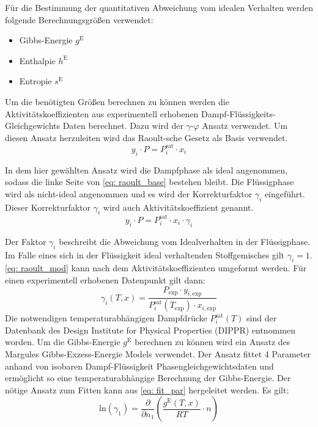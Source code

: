 \documentclass[../thesis.tex]{subfiles}
\begin{document}
Für die Bestimmung der quantitativen Abweichung vom idealen Verhalten werden folgende Berechnungsgrößen verwendet:
\begin{itemize}
	\item Gibbs-Energie $g^{\mathrm{E}}$
	\item Enthalpie $h^{\mathrm{E}}$
	\item Entropie $s^{\mathrm{E}}$
\end{itemize}

Um die benötigten Größen berechnen zu können werden die Aktivitätskoeffizienten aus experimentell erhobenen Dampf-Flüssigkeits-Gleichgewichts Daten berechnet. Dazu wird der $\gamma$-$\varphi$ Ansatz verwendet. Um diesen Ansatz herzuleiten wird das Raoult-sche Gesetz als Basis verwendet.
\begin{equation}
	\label{eq: raoult_base}
	y_i \cdot P = P_{i}^{\mathrm{sat}} \cdot x_i
\end{equation}

In dem hier gewählten Ansatz wird die Dampfphase als ideal angenommen, sodass die linke Seite von \autoref{eq: raoult_base} bestehen bleibt. Die Flüssigphase wird als nicht-ideal angenommen und es wird der Korrekturfaktor $\gamma_i$ eingeführt. Dieser Korrekturfaktor $\gamma_i$ wird auch Aktivitätskoeffizient genannt. 
\begin{equation}
	\label{eq: raoult_mod}
	y_i \cdot P = P_{i}^{\mathrm{sat}} \cdot x_i \cdot \gamma_i
\end{equation}

Der Faktor $\gamma_i$ beschreibt die Abweichung vom Idealverhalten in der Flüssigphase. Im Falle eines sich in der Flüssigkeit ideal verhaltenden Stoffgemisches gilt $\gamma_i = 1$. \autoref{eq: raoult_mod} kann nach dem Aktivitätskoeffizienten umgeformt werden. Für einen experimentell erhobenen Datenpunkt gilt dann:
\begin{equation}
	\gamma_i \left(T,x \right) = \dfrac{P_{\mathrm{exp}} \cdot y_{i,\mathrm{exp}}}{P_{i}^{\mathrm{sat}}(T_{\mathrm{exp}}) \cdot x_{i,\mathrm{exp}}}
\end{equation}
Die notwendigen temperaturabhängigen Dampfdrücke $P_{i}^{\mathrm{sat}}(T)$ sind der Datenbank des Design Institute for Physical Properties (DIPPR) \cite{thomson1996dippr} entnommen worden.
Um die Gibbs-Energie $g^{\mathrm{E}}$ berechnen zu können wird ein Ansatz des Margules Gibbs-Exzess-Energie Models verwendet. Der Ansatz fittet 4 Parameter anhand von isobaren Dampf-Flüssigkeit Phasengleichgewichtsdaten und ermöglicht so eine temperaturabhängige Berechnung der Gibbs-Energie. Der nötige Ansatz zum Fitten kann aus \autoref{eq: fit_par} hergeleitet werden. Es gilt:
\begin{equation}
	\label{eq: fit_par}
	\mathrm{ln}(\gamma_1) =  \dfrac{\partial }{\partial n_1} \left( \dfrac{g^{\mathrm{E}}(T,x)}{RT} \cdot n \right)
\end{equation}
\end{document}
